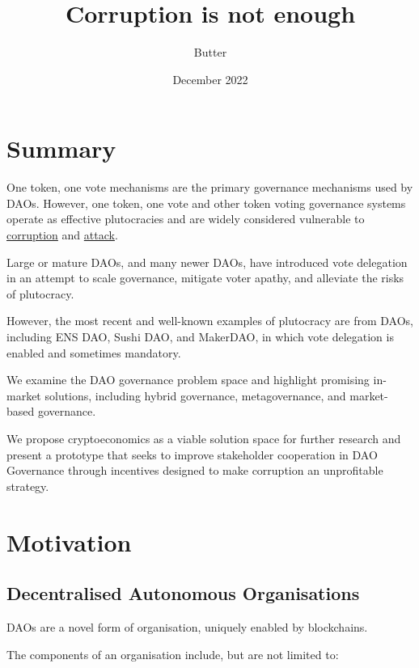 \documentclass[
]{article}
\title{Corruption is not enough}
\author{Butter}
\date{December 2022}
\begin{document}
\maketitle
\setcounter{tocdepth}{2}
\tableofcontents

\hypertarget{summary}{%
\section{Summary}\label{summary}}

One token, one vote mechanisms are the primary governance mechanisms
used by DAOs. However, one token, one vote and other token voting
governance systems operate as effective plutocracies and are widely
considered vulnerable to
\href{./problems.md\#corruption-problems}{corruption} and
\href{./problems.md\#attack-problems}{attack}.

Large or mature DAOs, and many newer DAOs, have introduced vote
delegation in an attempt to scale governance, mitigate voter apathy, and
alleviate the risks of plutocracy.

However, the most recent and well-known examples of plutocracy are from
DAOs, including ENS DAO, Sushi DAO, and MakerDAO, in which vote
delegation is enabled and sometimes mandatory.

We examine the DAO governance problem space and highlight promising
in-market solutions, including hybrid governance, metagovernance, and
market-based governance.

We propose cryptoeconomics as a viable solution space for further
research and present a prototype that seeks to improve stakeholder
cooperation in DAO Governance through incentives designed to make
corruption an unprofitable strategy.
\hypertarget{motivation}{%
\section{Motivation}\label{motivation}}

\hypertarget{decentralised-autonomous-organisations}{%
\subsection{Decentralised Autonomous
Organisations}\label{decentralised-autonomous-organisations}}

DAOs are a novel form of organisation, uniquely enabled by blockchains.

The components of an organisation include, but are not limited to:
\end{document}
